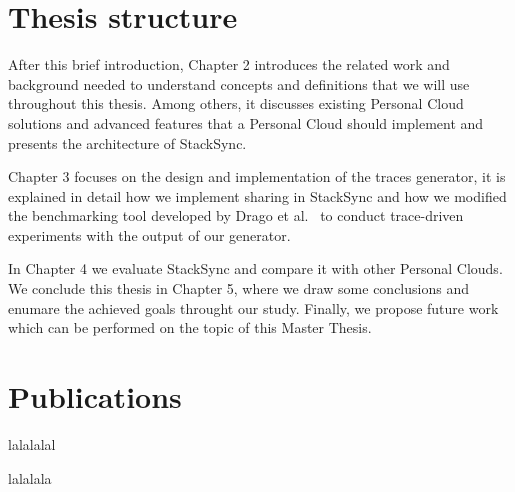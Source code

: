 \section{Thesis structure}
After this brief introduction, Chapter 2 introduces the related work and background needed to understand concepts
and definitions that we will use throughout this thesis. Among others, it discusses existing Personal Cloud solutions and advanced features that a Personal Cloud should implement and presents the architecture of StackSync.

Chapter 3 focuses on the design and implementation of the traces generator, it is explained in detail how we implement sharing in StackSync and how we modified the benchmarking tool developed by Drago et al.~\cite{drago2013benchmarking} to
conduct trace-driven experiments with the output of our generator.

In Chapter 4 we evaluate StackSync and compare it with other Personal Clouds. We conclude this thesis in Chapter 5, where we draw some conclusions and enumare the achieved goals throught our study. Finally, we propose future work which can be performed on the topic of this Master Thesis.

\section{Publications}

lalalalal

lalalala